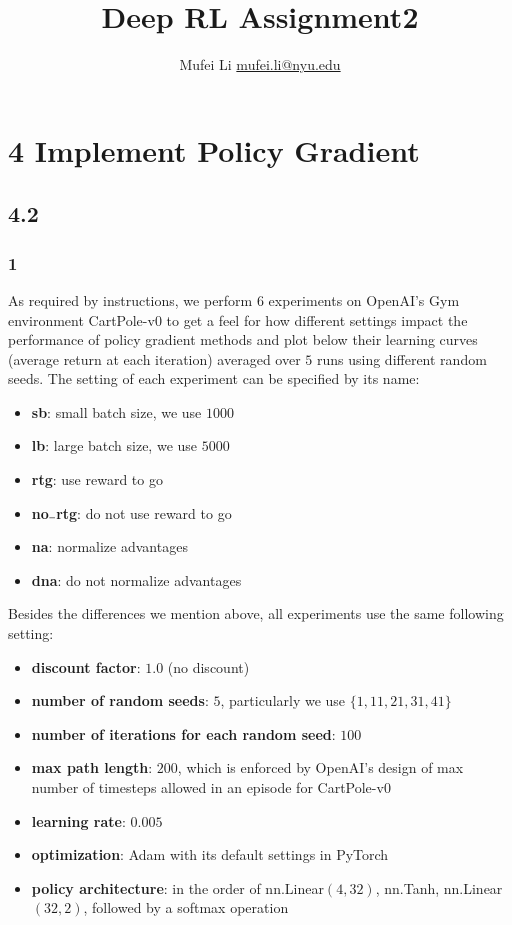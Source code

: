 \documentclass[a4paper]{article}
\title{Deep RL Assignment2}
\author{Mufei Li \href{mufei.li@nyu.edu}{mufei.li@nyu.edu}}
\theoremstyle{definition}
\begin{document}
\maketitle

\section*{4 Implement Policy Gradient}

\subsection*{4.2}

\subsubsection*{1}

As required by instructions, we perform $6$ experiments on OpenAI's Gym environment CartPole-v0 to get a feel for how different settings impact the performance of policy gradient methods and plot below their learning curves (average return at each iteration) averaged over $5$ runs using different random seeds. The setting of each experiment can be specified by its name:
\begin{itemize}
\item \textbf{sb}: small batch size, we use $1000$
\item \textbf{lb}: large batch size, we use $5000$
\item \textbf{rtg}: use reward to go
\item \textbf{no$\rule{0.15cm}{0.15mm}$rtg}: do not use reward to go
\item \textbf{na}: normalize advantages
\item \textbf{dna}: do not normalize advantages
\end{itemize}

Besides the differences we mention above, all experiments use the same following setting:
\begin{itemize}
\item \textbf{discount factor}: $1.0$ (no discount)
\item \textbf{number of random seeds}: $5$, particularly we use $\{1, 11, 21, 31, 41\}$
\item \textbf{number of iterations for each random seed}: $100$
\item \textbf{max path length}: $200$, which is enforced by OpenAI's design of max number of timesteps allowed in an episode for CartPole-v0
\item \textbf{learning rate}: $0.005$
\item \textbf{optimization}: Adam with its default settings in PyTorch
\item \textbf{policy architecture}: in the order of nn.Linear$(4, 32)$, nn.Tanh, nn.Linear$(32, 2)$, followed by a softmax operation
\end{itemize}
\end{document}
